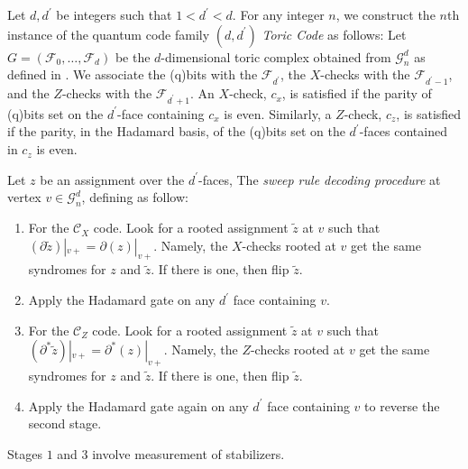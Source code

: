 
\cite{Dennis_2002}
\begin{definition} 
  Let $d, d^{\prime}$ be integers such that $1 < d^{\prime} < d$. For any integer $n$, we construct the $n$th instance of the quantum code family $(d,d^{\prime})$ \textit{Toric Code} as follows: Let $G = (\mathcal{F}_{0}, \ldots, \mathcal{F}_{d})$ be the $d$-dimensional toric complex obtained from $\mathcal{G}_{n}^{d}$ as defined in . We associate the (q)bits with the $\mathcal{F}_{d^{\prime}}$, the $X$-checks with the $\mathcal{F}_{d^{\prime}-1}$, and the $Z$-checks with the $\mathcal{F}_{d^{\prime}+1}$. An $X$-check, $c_{x}$, is satisfied if the parity of (q)bits set on the $d^{\prime}$-face containing $c_{x}$ is even. Similarly, a $Z$-check, $c_{z}$, is satisfied if the parity, in the Hadamard basis, of the (q)bits set on the $d^{\prime}$-faces contained in $c_{z}$ is even.
\end{definition}

\begin{definition}
  Let $z$ be an assignment over the $d^\prime$-faces, The \textit{sweep rule decoding procedure} at vertex $v \in \mathcal{G}_{n}^{d}$, defining as follow: 
  \begin{enumerate}
    \item For the $\mathcal{C}_{X}$ code. Look for a rooted assignment $\tilde{z}$ at $v$ such that $(\partial\tilde{z})|_{v+} = \partial(z)|_{v+}$. Namely, the $X$-checks rooted at $v$ get the same syndromes for $z$ and $\tilde{z}$. If there is one, then flip $\tilde{z}$. 
    \item Apply the Hadamard gate on any $d^{\prime}$ face containing $v$.
    \item For the $\mathcal{C}_{Z}$ code. Look for a rooted assignment $\tilde{z}$ at $v$ such that $(\partial^{*}\tilde{z})|_{v+} = \partial^{*}(z)|_{v+}$. Namely, the $Z$-checks rooted at $v$ get the same syndromes for $z$ and $\tilde{z}$. If there is one, then flip $\tilde{z}$.
    \item Apply the Hadamard gate again on any $d^{\prime}$ face containing $v$ to reverse the second stage.
  \end{enumerate}
  Stages $1$ and $3$ involve measurement of stabilizers.
\end{definition}

